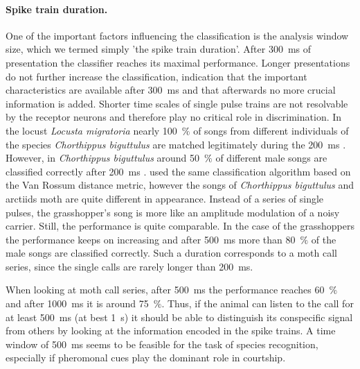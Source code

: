 \documentclass[12pt,a4paper]{article}
\newcommand{\species}[1]{\textit{#1}}
\newcommand{\percent}[1]{#1~$\%$}
\begin{document}
\paragraph{Spike train duration.} One of the important factors influencing the classification is the analysis window size, which we termed simply 'the spike train duration'. After 300~ms of presentation the classifier reaches its maximal performance. Longer presentations do not further increase the classification, indication that the important characteristics are available after 300~ms and that afterwards no more crucial information is added. Shorter time scales of single pulse trains are not resolvable by the receptor neurons and therefore play no critical role in discrimination. In the locust \species{Locusta migratoria} nearly \percent{100} of songs from different individuals of the species \species{Chorthippus biguttulus} are matched legitimately during the 200~ms \cite{machens2001a}. However, in \species{Chorthippus biguttulus} around \percent{50} of different male songs are classified correctly after 200~ms \cite{machens2003}. \cite{machens2003} used the same classification algorithm based on the Van Rossum distance metric, however the songs of \species{Chorthippus biguttulus} and arctiids moth are quite different in appearance. Instead of a series of single pulses, the grasshopper's song is more like an amplitude modulation of a noisy carrier. Still, the performance is quite comparable. In the case of the grasshoppers the performance keeps on increasing and after 500~ms more than \percent{80} of the male songs are classified correctly. Such a duration corresponds to a moth call series, since the single calls are rarely longer than 200~ms. 

When looking at moth call series, after 500~ms the performance reaches \percent{60} and after 1000~ms it is around \percent{75}. Thus, if the animal can listen to the call for at least 500~ms (at best 1~s) it should be able to distinguish its conspecific signal from others by looking at the information encoded in the spike trains. A time window of 500~ms seems to be feasible for the task of species recognition, especially if pheromonal cues play the dominant role in courtship.
\end{document}
